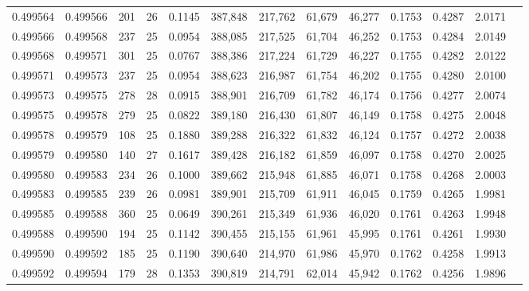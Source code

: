 \begin{tabular}{rrrrrrrrrrrrr}
0.499564 & 0.499566 & 201 &  26 &                                     0.1145 & 387,848 & 217,762 &  61,679 &  46,277 & 0.1753 & 0.4287 & 2.0171 \\
0.499566 & 0.499568 & 237 &  25 &                                     0.0954 & 388,085 & 217,525 &  61,704 &  46,252 & 0.1753 & 0.4284 & 2.0149 \\
0.499568 & 0.499571 & 301 &  25 &                                     0.0767 & 388,386 & 217,224 &  61,729 &  46,227 & 0.1755 & 0.4282 & 2.0122 \\
0.499571 & 0.499573 & 237 &  25 &                                     0.0954 & 388,623 & 216,987 &  61,754 &  46,202 & 0.1755 & 0.4280 & 2.0100 \\
0.499573 & 0.499575 & 278 &  28 &                                     0.0915 & 388,901 & 216,709 &  61,782 &  46,174 & 0.1756 & 0.4277 & 2.0074 \\
0.499575 & 0.499578 & 279 &  25 &                                     0.0822 & 389,180 & 216,430 &  61,807 &  46,149 & 0.1758 & 0.4275 & 2.0048 \\
0.499578 & 0.499579 & 108 &  25 &                                     0.1880 & 389,288 & 216,322 &  61,832 &  46,124 & 0.1757 & 0.4272 & 2.0038 \\
0.499579 & 0.499580 & 140 &  27 &                                     0.1617 & 389,428 & 216,182 &  61,859 &  46,097 & 0.1758 & 0.4270 & 2.0025 \\
0.499580 & 0.499583 & 234 &  26 &                                     0.1000 & 389,662 & 215,948 &  61,885 &  46,071 & 0.1758 & 0.4268 & 2.0003 \\
0.499583 & 0.499585 & 239 &  26 &                                     0.0981 & 389,901 & 215,709 &  61,911 &  46,045 & 0.1759 & 0.4265 & 1.9981 \\
0.499585 & 0.499588 & 360 &  25 &                                     0.0649 & 390,261 & 215,349 &  61,936 &  46,020 & 0.1761 & 0.4263 & 1.9948 \\
0.499588 & 0.499590 & 194 &  25 &                                     0.1142 & 390,455 & 215,155 &  61,961 &  45,995 & 0.1761 & 0.4261 & 1.9930 \\
0.499590 & 0.499592 & 185 &  25 &                                     0.1190 & 390,640 & 214,970 &  61,986 &  45,970 & 0.1762 & 0.4258 & 1.9913 \\
0.499592 & 0.499594 & 179 &  28 &                                     0.1353 & 390,819 & 214,791 &  62,014 &  45,942 & 0.1762 & 0.4256 & 1.9896 \\

\end{tabular}
